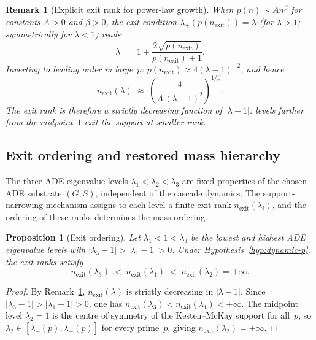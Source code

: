 \documentclass[11pt,a4paper]{article}
\newtheorem{proposition}[theorem]{Proposition}
\newtheorem{remark}[theorem]{Remark}
\newcommand{\nexit}{n_{\mathrm{exit}}}
\begin{document}
      \begin{remark}[Explicit exit rank for power-law growth]
        \label{rem:exit-explicit}
        When $p(n) \sim A n^{\beta}$ for constants $A > 0$ and $\beta > 0$,
        the exit condition $\lambda_{+}(p(\nexit)) = \lambda$
        (for $\lambda > 1$; symmetrically for $\lambda < 1$) reads
        \begin{equation}
          \label{eq:exit-implicit}
          \lambda \;=\; 1 + \frac{2\sqrt{p(\nexit)}}{p(\nexit)+1}.
        \end{equation}
        Inverting to leading order in large~$p$:
        $p(\nexit) \approx 4(\lambda-1)^{-2}$, and hence
        \begin{equation}
          \label{eq:exit-rank}
          \nexit(\lambda) \;\approx\;
          \left(\frac{4}{A\,(\lambda-1)^{2}}\right)^{1/\beta}.
        \end{equation}
        The exit rank is therefore a strictly decreasing function of $|\lambda - 1|$:
        levels farther from the midpoint~$1$ exit the support at smaller rank.
      \end{remark}

    \subsection{Exit ordering and restored mass hierarchy}
      \label{subsec:ordering}

      The three ADE eigenvalue levels $\lambda_1 < \lambda_2 < \lambda_3$
      are fixed properties of the chosen ADE substrate $(G,S)$,
      independent of the cascade dynamics.
      The support-narrowing mechanism assigns to each level a finite exit
      rank $\nexit(\lambda_i)$, and the ordering of these ranks determines
      the mass ordering.

      \begin{proposition}[Exit ordering]
        \label{prop:exit-ordering}
        Let $\lambda_1 < 1 < \lambda_3$ be the lowest and highest ADE eigenvalue
        levels with $|\lambda_3 - 1| > |\lambda_1 - 1| > 0$.
        Under Hypothesis~\ref{hyp:dynamic-p}, the exit ranks satisfy
        \begin{equation}
          \label{eq:exit-ordering}
          \nexit(\lambda_3) \;<\; \nexit(\lambda_1) \;<\; \nexit(\lambda_2) = +\infty.
        \end{equation}
      \end{proposition}

      \begin{proof}
        By Remark~\ref{rem:exit-explicit}, $\nexit(\lambda)$ is strictly decreasing
        in $|\lambda - 1|$.
        Since $|\lambda_3 - 1| > |\lambda_1 - 1| > 0$,
        one has $\nexit(\lambda_3) < \nexit(\lambda_1) < +\infty$.
        The midpoint level $\lambda_2 = 1$ is the centre of symmetry of the
        Kesten--McKay support for all~$p$, so
        $\lambda_2 \in [\lambda_{-}(p),\lambda_{+}(p)]$ for every prime~$p$,
        giving $\nexit(\lambda_2) = +\infty$.
      \end{proof}
\end{document}
